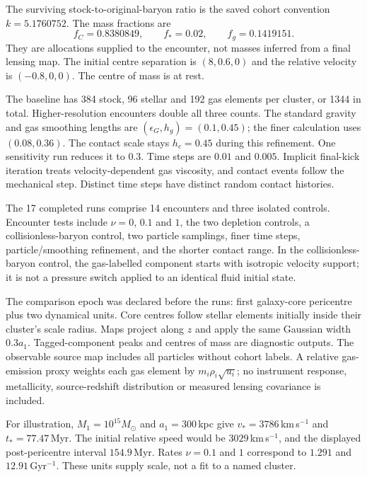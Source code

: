 \documentclass[11pt]{article}
\begin{document}
The surviving stock-to-original-baryon ratio is the saved cohort convention
$k=5.1760752$. The mass fractions are
\begin{equation}
 f_C=0.8380849,\qquad f_*=0.02,\qquad f_g=0.1419151.
\end{equation}
They are allocations supplied to the encounter, not masses inferred from a
final lensing map. The initial centre separation is $(8,0.6,0)$ and the
relative velocity is $(-0.8,0,0)$. The centre of mass is at rest.

The baseline has 384 stock, 96 stellar and 192 gas elements per cluster,
or 1344 in total. Higher-resolution encounters double all three counts.
The standard gravity and gas smoothing lengths are $(\epsilon_G,h_g)=(0.1,0.45)$;
the finer calculation uses $(0.08,0.36)$. The contact scale stays $h_c=0.45$
during this refinement. One sensitivity run reduces it to $0.3$.
Time steps are $0.01$ and $0.005$. Implicit final-kick iteration treats
velocity-dependent gas viscosity, and contact events follow the mechanical
step. Distinct time steps have distinct random contact histories.

The 17 completed runs comprise 14 encounters and three isolated controls.
Encounter tests include $\nu=0$, $0.1$ and $1$, the two depletion controls,
a collisionless-baryon control, two particle samplings, finer time steps,
particle/smoothing refinement, and the shorter contact range. In the
collisionless-baryon control, the gas-labelled component starts with isotropic
velocity support; it is not a pressure switch applied to an identical fluid
initial state.

The comparison epoch was declared before the runs: first galaxy-core
pericentre plus two dynamical units. Core centres follow stellar elements
initially inside their cluster's scale radius. Maps project along $z$ and
apply the same Gaussian width $0.3a_1$. Tagged-component peaks and centres
of mass are diagnostic outputs. The observable source map includes all
particles without cohort labels. A relative gas-emission proxy weights each
gas element by $m_i\rho_i\sqrt{u_i}$; no instrument response, metallicity,
source-redshift distribution or measured lensing covariance is included.

For illustration, $M_1=10^{15}M_\odot$ and $a_1=300\,$kpc give
$v_*=3786\,$km\,s$^{-1}$ and $t_*=77.47\,$Myr. The initial relative speed
would be $3029\,$km\,s$^{-1}$, and the displayed post-pericentre interval
$154.9\,$Myr. Rates $\nu=0.1$ and $1$ correspond to $1.291$ and
$12.91\,$Gyr$^{-1}$. These units supply scale, not a fit to a named cluster.
\end{document}
